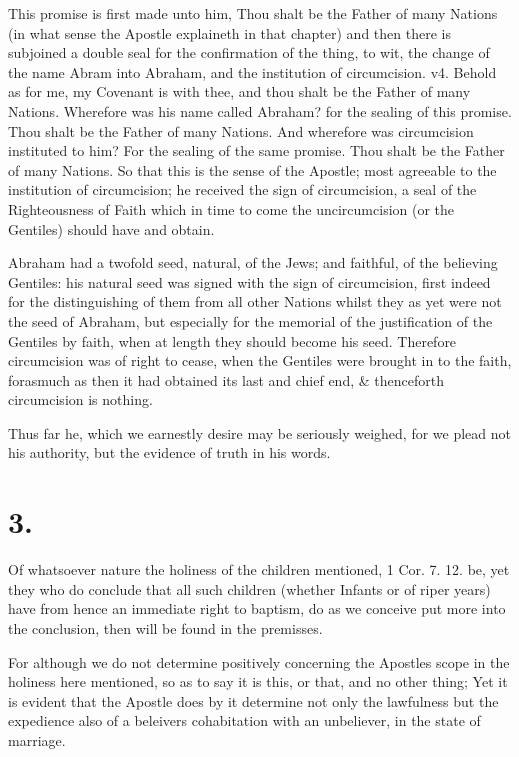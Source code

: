\documentclass[12pt,a4paper]{book}
\begin{document}
This promise is first made unto him, Thou shalt be the Father of many Nations (in what sense the Apostle explaineth in that chapter) and then there is subjoined a double seal for the confirmation of the thing, to wit, the change of the name Abram into Abraham, and the institution of circumcision. v4. Behold as for me, my Covenant is with thee, and thou shalt be the Father of many Nations. Wherefore was his name called Abraham? for the sealing of this promise. Thou shalt be the Father of many Nations. And wherefore was circumcision instituted to him? For the sealing of the same promise. Thou shalt be the Father of many Nations. So that this is the sense of the Apostle; most agreeable to the institution of circumcision; he received the sign of circumcision, a seal of the Righteousness of Faith which in time to come the uncircumcision (or the Gentiles) should have and obtain.

Abraham had a twofold seed, natural, of the Jews; and faithful, of the believing Gentiles: his natural seed was signed with the sign of circumcision, first indeed for the distinguishing of them from all other Nations whilst they as yet were not the seed of Abraham, but especially for the memorial of the justification of the Gentiles by faith, when at length they should become his seed. Therefore circumcision was of right to cease, when the Gentiles were brought in to the faith, forasmuch as then it had obtained its last and chief end, & thenceforth circumcision is nothing.

Thus far he, which we earnestly desire may be seriously weighed, for we plead not his authority, but the evidence of truth in his words.

\section{3.}
Of whatsoever nature the holiness of the children mentioned, 1 Cor. 7. 12. be, yet they who do conclude that all such children (whether Infants or of riper years) have from hence an immediate right to baptism, do as we conceive put more into the conclusion, then will be found in the premisses.

For although we do not determine positively concerning the Apostles scope in the holiness here mentioned, so as to say it is this, or that, and no other thing; Yet it is evident that the Apostle does by it determine not only the lawfulness but the expedience also of a beleivers cohabitation with an unbeliever, in the state of marriage.
\end{document}
